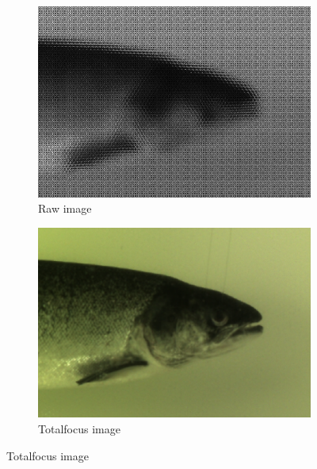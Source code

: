\begin{figure}[h]
    \begin{subfigure}{0.49\textwidth}
        \includegraphics[width=\linewidth]{images/hardware/raytrix_raw_image}
        \caption{Raw image} 
        \label{fig:raw_image}
    \end{subfigure}\hspace*{\fill}
    \begin{subfigure}{0.49\textwidth}
        \includegraphics[width=\linewidth]{images/hardware/raytrix_totalfocus_image}
        \caption{Totalfocus image} 
        \label{fig:totalfocus}
    \end{subfigure}
    

\end{figure}
